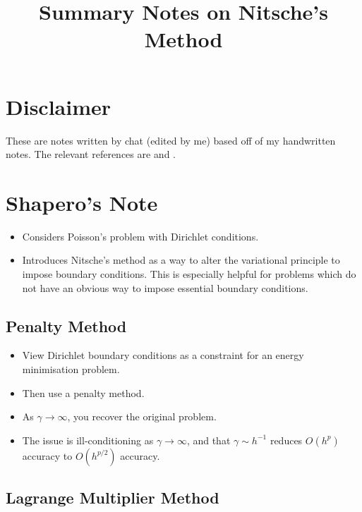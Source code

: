 \documentclass[11pt,a4paper]{article}
\title{\textbf{Summary Notes on Nitsche's Method}}
\author{}
\date{}
\begin{document}
\maketitle

\section{Disclaimer}
These are notes written by chat (edited by me) based off of my handwritten notes. The relevant references are \cite{BenzakenEvansTamstorf2024} and \cite{Shapero2019}.

\section{Shapero's Note \cite{Shapero2019}}

\begin{itemize}
    \item Considers Poisson's problem with Dirichlet conditions.

    \item Introduces Nitsche's method as a way to alter the variational principle to impose boundary conditions. This is especially helpful for problems which do not have an obvious way to impose essential boundary conditions.
\end{itemize}

\subsection{Penalty Method}

\begin{itemize}
    \item View Dirichlet boundary conditions as a constraint for an energy minimisation problem.

    \item Then use a penalty method.

    \item As $\gamma\to\infty$, you recover the original problem.

    \item The issue is ill-conditioning as $\gamma\to\infty$, and that $\gamma\sim h^{-1}$ reduces $O(h^p)$ accuracy to $O(h^{p/2})$ accuracy.
\end{itemize}

\subsection{Lagrange Multiplier Method}
\end{document}
